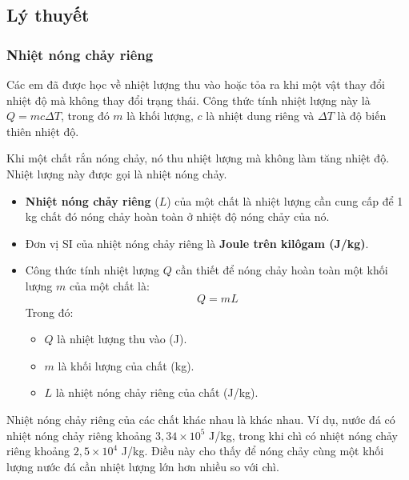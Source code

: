 

\subsection{Lý thuyết}

\subsubsection{Nhiệt nóng chảy riêng}

\begin{emdahoc}
Các em đã được học về nhiệt lượng thu vào hoặc tỏa ra khi một vật thay đổi nhiệt độ mà không thay đổi trạng thái. Công thức tính nhiệt lượng này là $Q = mc\Delta T$, trong đó $m$ là khối lượng, $c$ là nhiệt dung riêng và $\Delta T$ là độ biến thiên nhiệt độ.
\end{emdahoc}

\begin{kienthuc}
Khi một chất rắn nóng chảy, nó thu nhiệt lượng mà không làm tăng nhiệt độ. Nhiệt lượng này được gọi là nhiệt nóng chảy.
\begin{itemize}
    \item \textbf{Nhiệt nóng chảy riêng} ($L$) của một chất là nhiệt lượng cần cung cấp để 1 kg chất đó nóng chảy hoàn toàn ở nhiệt độ nóng chảy của nó.
    \item Đơn vị SI của nhiệt nóng chảy riêng là \textbf{Joule trên kilôgam (J/kg)}.
    \item Công thức tính nhiệt lượng $Q$ cần thiết để nóng chảy hoàn toàn một khối lượng $m$ của một chất là:
    \[ Q = mL \]
    Trong đó:
    \begin{itemize}
        \item $Q$ là nhiệt lượng thu vào (J).
        \item $m$ là khối lượng của chất (kg).
        \item $L$ là nhiệt nóng chảy riêng của chất (J/kg).
    \end{itemize}
\end{itemize}
\end{kienthuc}

\begin{emcobiet}
Nhiệt nóng chảy riêng của các chất khác nhau là khác nhau. Ví dụ, nước đá có nhiệt nóng chảy riêng khoảng $3,34 \times 10^5$ J/kg, trong khi chì có nhiệt nóng chảy riêng khoảng $2,5 \times 10^4$ J/kg. Điều này cho thấy để nóng chảy cùng một khối lượng nước đá cần nhiệt lượng lớn hơn nhiều so với chì.
\end{emcobiet}

